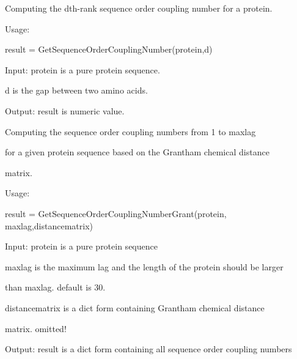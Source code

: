\documentclass[letterpaper,10pt,english]{sphinxmanual}
\begin{document}

\begin{fulllineitems}
\label{reference/QuasiSequenceOrder:QuasiSequenceOrder.GetSequenceOrderCouplingNumber}
Computing the dth-rank sequence order coupling number for a protein.

Usage:

result = GetSequenceOrderCouplingNumber(protein,d)

Input: protein is a pure protein sequence.

d is the gap between two amino acids.

Output: result is numeric value.

\end{fulllineitems}


\begin{fulllineitems}
\label{reference/QuasiSequenceOrder:QuasiSequenceOrder.GetSequenceOrderCouplingNumberGrant}
Computing the sequence order coupling numbers from 1 to maxlag

for a given protein sequence based on the Grantham chemical distance

matrix.

Usage:

result = GetSequenceOrderCouplingNumberGrant(protein, maxlag,distancematrix)

Input: protein is a pure protein sequence

maxlag is the maximum lag and the length of the protein should be larger

than maxlag. default is 30.

distancematrix is a dict form containing Grantham chemical distance

matrix. omitted!

Output: result is a dict form containing all sequence order coupling numbers

\end{fulllineitems}

\end{document}
